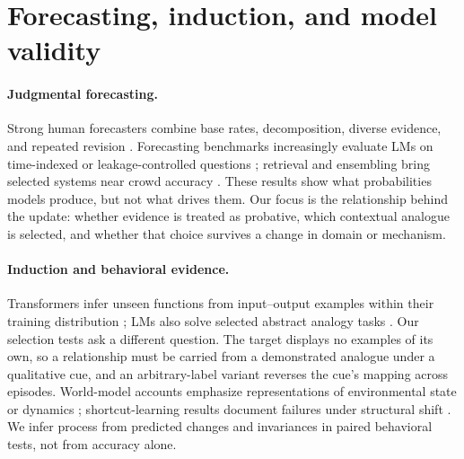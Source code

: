 \section{Forecasting, induction, and model validity}
\label{sec:related-work}

\paragraph{Judgmental forecasting.}
Strong human forecasters combine base rates, decomposition, diverse evidence,
and repeated revision \citep{tetlock2005expert,mellers2014psychological,tetlock2016superforecasting}.
Forecasting benchmarks increasingly evaluate LMs on time-indexed or
leakage-controlled questions \citep{zou2022forecasting,karger2025forecastbench};
retrieval and ensembling bring selected systems near crowd accuracy
\citep{halawi2024approaching,schoenegger2024wisdom}. These results show what
probabilities models produce, but not what drives them. Our focus is the
relationship behind the update:
whether evidence is treated as probative, which contextual analogue is selected,
and whether that choice survives a change in domain or mechanism.

\paragraph{Induction and behavioral evidence.}
Transformers infer unseen functions from input--output examples within their
training distribution \citep{garg2022what,chan2022data}; LMs also solve
selected abstract analogy tasks \citep{webb2023emergent,yasunaga2024large}. Our
selection tests ask a different question. The target displays no examples of
its own, so a relationship must be carried from a demonstrated analogue under a
qualitative cue, and an arbitrary-label variant reverses the cue's mapping across
episodes. World-model accounts emphasize representations of environmental state
or dynamics \citep{ha2018world,lecun2022path,li2023emergent}; shortcut-learning
results document failures under structural shift
\citep{geirhos2020shortcut,mitchell2023ai,vafa2025foundation}. We infer process
from predicted changes and invariances in paired behavioral tests, not from
accuracy alone.

